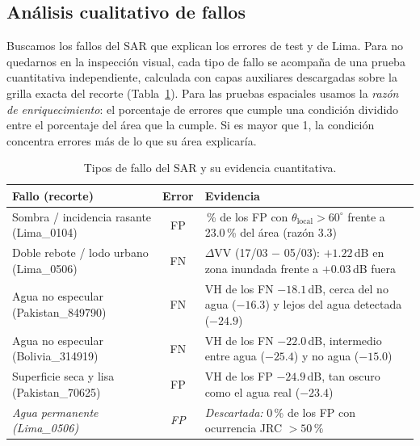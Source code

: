 \subsection{Análisis cualitativo de fallos}
\label{sec:fallos}

Buscamos los fallos del SAR que explican los errores de test y de Lima. Para no quedarnos en la
inspección visual, cada tipo de fallo se acompaña de una prueba cuantitativa independiente,
calculada con capas auxiliares descargadas sobre la grilla exacta del recorte
(Tabla~\ref{tab:fallos}). Para las pruebas espaciales usamos la \emph{razón de enriquecimiento}:
el porcentaje de errores que cumple una condición dividido entre el porcentaje del área que la
cumple. Si es mayor que 1, la condición concentra errores más de lo que su área explicaría.

\begin{table}[t]
\centering
\caption{Tipos de fallo del SAR y su evidencia cuantitativa.}
\label{tab:fallos}
\setlength{\tabcolsep}{3pt}
\begin{tabular}{@{}>{\raggedright\arraybackslash}p{2.4cm}c>{\raggedright\arraybackslash}p{4.6cm}@{}}
\toprule
Fallo (recorte) & Error & Evidencia \\
\midrule
Sombra / incidencia rasante (Lima\_0104) & FP &
  76.5\,\% de los FP con $\theta_{\text{local}}>60^\circ$ frente a 23.0\,\% del área
  (razón 3.3) \\
Doble rebote / lodo urbano (Lima\_0506) & FN &
  $\Delta$VV (17/03 $-$ 05/03): $+1.22$\,dB en zona inundada frente a $+0.03$\,dB fuera \\
Agua no especular (Pakistan\_849790) & FN &
  VH de los FN $-18.1$\,dB, cerca del no agua ($-16.3$) y lejos del agua detectada
  ($-24.9$) \\
Agua no especular (Bolivia\_314919) & FN &
  VH de los FN $-22.0$\,dB, intermedio entre agua ($-25.4$) y no agua ($-15.0$) \\
Superficie seca y lisa (Pakistan\_70625) & FP &
  VH de los FP $-24.9$\,dB, tan oscuro como el agua real ($-23.4$) \\
\midrule
\emph{Agua permanente (Lima\_0506)} & \emph{FP} &
  \emph{Descartada:} 0\,\% de los FP con ocurrencia JRC $>50$\,\% \\
\bottomrule
\end{tabular}
\end{table}

